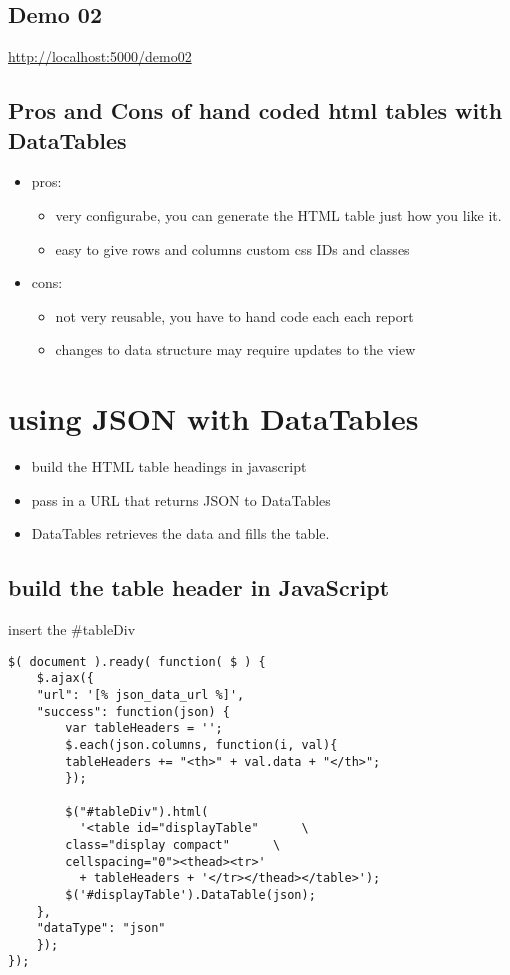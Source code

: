\documentclass[11pt]{article}
\begin{document}
\subsection*{Demo 02}
\label{sec:orgheadline16}
\url{http://localhost:5000/demo02}

\subsection*{Pros and Cons of hand coded html tables with DataTables}
\label{sec:orgheadline17}
\begin{itemize}
\item pros:
\begin{itemize}
\item very configurabe, you can generate the HTML table just how you like it.
\item easy to give rows and columns custom css IDs and classes
\end{itemize}
\item cons:
\begin{itemize}
\item not very reusable, you have to hand code each each report
\item changes to data structure may require updates to the view
\end{itemize}
\end{itemize}
\section*{using JSON with DataTables}
\label{sec:orgheadline23}
\begin{itemize}
\item build the HTML table headings in javascript
\item pass in a URL that returns JSON to DataTables
\item DataTables retrieves the data and fills the table.
\end{itemize}

\subsection*{build the table header in JavaScript}
\label{sec:orgheadline19}
insert the \#tableDiv
\begin{verbatim}
$( document ).ready( function( $ ) {
    $.ajax({
	"url": '[% json_data_url %]',
	"success": function(json) {
	    var tableHeaders = '';  
	    $.each(json.columns, function(i, val){
		tableHeaders += "<th>" + val.data + "</th>";
	    });

	    $("#tableDiv").html(
	      '<table id="displayTable"      \
		class="display compact"      \
		cellspacing="0"><thead><tr>'
	      + tableHeaders + '</tr></thead></table>');
	    $('#displayTable').DataTable(json);
	},
	"dataType": "json"
    });
});
\end{verbatim}
\end{document}
